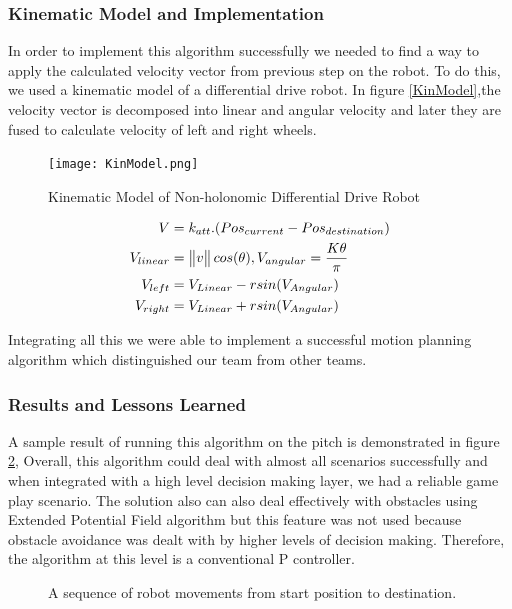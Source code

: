 \subsubsection{Kinematic Model and Implementation}
In order to implement this algorithm successfully we needed to find a way to apply the calculated velocity vector from previous step on the robot. To do this, we used a kinematic model of a differential drive robot. In figure \ref{KinModel},the velocity vector is decomposed into linear and angular velocity and later they are fused to calculate velocity of left and right wheels.
\begin{figure}[htp]
\begin{center}
\leavevmode
\texttt{[image: KinModel.png]}
\end{center}
\caption{Kinematic Model of Non-holonomic Differential Drive Robot}
\label{fig:KinModel}
\end{figure}
\begin{align}
V & =k_{att}.(Pos_{current}-Pos_{destination})\\
V_{linear} &= \begin{Vmatrix}v\end{Vmatrix} cos(\theta) ,
V_{angular} = {K\theta \over \pi}\\
V_{left}&=V_{Linear}-rsin(V_{Angular})\\
V_{right}&=V_{Linear}+rsin(V_{Angular})
\end{align}

Integrating all this we were able to implement a successful motion planning algorithm which distinguished our team from other teams.\linebreak

\subsubsection{Results and Lessons Learned}
A sample result of running this algorithm on the pitch is demonstrated in figure \ref{fig:seq}, Overall, this algorithm could deal with almost all scenarios successfully and when integrated with a high level decision making layer, we had a reliable game play scenario. 
The solution also can also deal effectively with obstacles using Extended Potential Field algorithm\cite{paper:OKhatib} but this feature was not used because obstacle avoidance was dealt with by higher levels of decision making. Therefore, the algorithm at this level is a conventional P controller.  

\begin{figure}[!bp]
\begin{center}
\caption{A sequence of robot movements from start position to destination.}
\label{fig:seq}
\end{center}
\end{figure}

